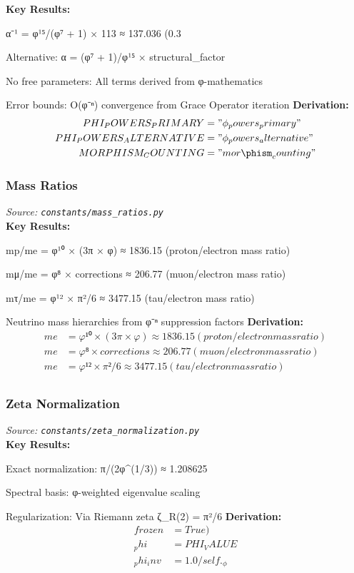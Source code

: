 \textbf{Key Results:}
\item α⁻¹ = φ¹⁵/(φ⁷ + 1) × 113 ≈ 137.036 (0.3%
\item Alternative: α = (φ⁷ + 1)/φ¹⁵ × structural_factor
\item No free parameters: All terms derived from φ-mathematics
\item Error bounds: O(φ⁻ⁿ) convergence from Grace Operator iteration
\textbf{Derivation:}
\begin{align}
PHI_POWERS_PRIMARY &= "\phi_powers_primary" \\
PHI_POWERS_ALTERNATIVE &= "\phi_powers_alternative" \\
MORPHISM_COUNTING &= "mor\phism_counting" \\
\end{align}

\subsubsection{Mass Ratios}
\textit{Source: \texttt{constants/mass_ratios.py}}\\

\textbf{Key Results:}
\item mp/me = φ¹⁰ × (3π × φ) ≈ 1836.15 (proton/electron mass ratio)
\item mμ/me = φ⁸ × corrections ≈ 206.77 (muon/electron mass ratio)
\item mτ/me = φ¹² × π²/6 ≈ 3477.15 (tau/electron mass ratio)
\item Neutrino mass hierarchies from φ⁻ⁿ suppression factors
\textbf{Derivation:}
\begin{align}
me &= φ¹⁰ × (3π × φ) ≈ 1836.15 (proton/electron mass ratio) \\
me &= φ⁸ × corrections ≈ 206.77 (muon/electron mass ratio) \\
me &= φ¹² × π²/6 ≈ 3477.15 (tau/electron mass ratio) \\
\end{align}

\subsubsection{Zeta Normalization}
\textit{Source: \texttt{constants/zeta_normalization.py}}\\

\textbf{Key Results:}
\item Exact normalization: π/(2φ^(1/3)) ≈ 1.208625
\item Spectral basis: φ-weighted eigenvalue scaling
\item Regularization: Via Riemann zeta ζ_R(2) = π²/6
\textbf{Derivation:}
\begin{align}
frozen &= True) \\
_phi &= PHI_VALUE \\
_phi_inv &= 1.0 / self._\phi \\
\end{align}

